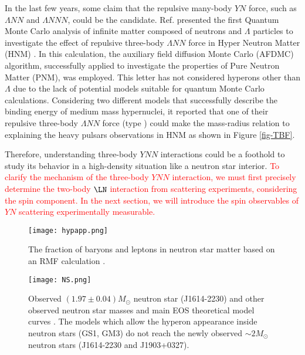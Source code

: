 In the last few years, some claim that the repulsive many-body $YN$ force, such as $\Lambda NN$ and $\Lambda NNN$, could be the candidate. Ref. \cite{Schmidt-1999} presented the first Quantum Monte Carlo analysis of infinite matter composed of neutrons and $\Lambda$ particles to investigate the effect of repulsive three-body $\Lambda NN$ force in Hyper Neutron Matter (HNM) \cite{Diego-2015}. In this calculation, the auxiliary field diffusion Monte Carlo (AFDMC) algorithm, successfully applied to investigate the properties of Pure Neutron Matter (PNM), was employed. This letter has not considered hyperons other than $\Lambda$ due to the lack of potential models suitable for quantum Monte Carlo calculations. Considering two different models that successfully describe the binding energy of medium mass hypernuclei, it reported that one of their repulsive three-body $\Lambda NN$ force (type ) could make the mass-radius relation to explaining the heavy pulsars observations in HNM as shown in Figure \ref{fig-TBF}.

Therefore, understanding three-body $YNN$ interactions could be a foothold to study its behavior in a high-density situation like a neutron star interior. \textcolor{red}{To clarify the mechanism of the three-body $YNN$ interaction, we must first precisely determine the two-body $\LN$ interaction from scattering experiments, considering the spin component. In the next section, we will introduce the spin observables of $YN$ scattering experimentally measurable.}

\begin{figure}[h]
  \begin{center}
   \texttt{[image: hypapp.png]}
   \caption{The fraction of baryons and leptons in neutron star matter based on an RMF calculation \cite{RMF-2008}.}
   \label{fig-hypapp}
 \end{center}
\end{figure}

\begin{figure}[h]
  \begin{center}
   \texttt{[image: NS.png]}
   \caption{Observed $(1.97\pm0.04)M_{\odot}$ neutron star (J1614-2230) and other observed neutron star masses and main EOS theoretical model curves \cite{NS-1}. The models which allow the hyperon appearance inside neutron stars (GS1, GM3) do not reach the newly observed $\sim2M_{\odot}$ neutron stars (J1614-2230 and J1903+0327).}
   \label{fig-NS}
 \end{center}
\end{figure}

